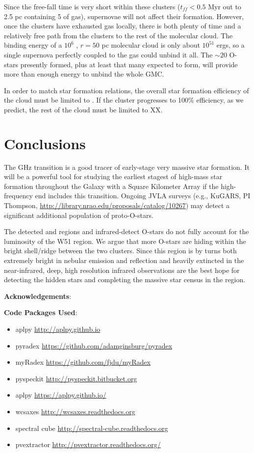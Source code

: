 Since the free-fall time is very short within these clusters ($t_{ff} < 0.5$
Myr out to 2.5 pc containing 5 \msun of gas), supernovae will not affect
their formation.  However, once the clusters have exhausted gas locally, there
is both plenty of time and a relatively free path from the clusters to the rest
of the molecular cloud.  The binding energy of a $10^6$ \msun, $r=50$ pc 
molecular cloud is only about $10^{51}$ ergs, so a single supernova perfectly
coupled to the gas could unbind it all.  The $\sim20$ O-stars presently formed,
plus at least that many expected to form, will provide more than enough energy
to unbind the whole GMC.

In order to match star formation relations, the overall star formation
efficiency of the cloud must be limited to .
If the cluster progresses to 100\% efficiency, as we predict, the rest of the
cloud must be limited to XX.

\section{Conclusions}

The \formaldehyde {} GHz transition is a good tracer of early-stage
very massive star formation.  It will be a powerful tool for studying the earliest
stagest of high-mass star formation throughout the Galaxy with a Square
Kilometer Array if the high-frequency end includes this transition.  Ongoing
JVLA surveys (e.g., KuGARS, PI Thompson,
\url{http://library.nrao.edu/proposals/catalog/10267}) may detect a significant
additional population of proto-O-stars.

The detected \uchii and \hchii regions and infrared-detect O-stars do not fully
account for the luminosity of the W51 region.  We argue that more O-stars
are hiding within the bright shell/ridge between the two clusters.  Since this
region is by turns both extremely bright in nebular emission and reflection and
heavily extincted in the near-infrared, deep, high resolution infrared
observations are the best hope for detecting the hidden stars and completing
the massive star census in the region.


\textbf{Acknowledgements}:

\textbf{Code Packages Used}:

\begin{itemize}
    \item aplpy \url{http://aplpy.github.io}
    \item pyradex \url{https://github.com/adamginsburg/pyradex}
    \item myRadex \url{https://github.com/fjdu/myRadex}
    \item pyspeckit \url{http://pyspeckit.bitbucket.org}
    \item aplpy \url{https://aplpy.github.io/}
    \item wcsaxes \url{http://wcsaxes.readthedocs.org}
    \item spectral cube \url{http://spectral-cube.readthedocs.org}
    \item pvextractor \url{http://pvextractor.readthedocs.org/}
\end{itemize}





%


